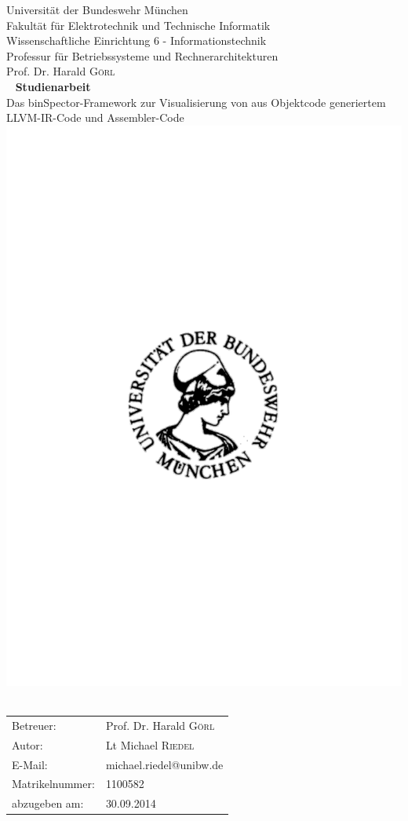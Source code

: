\begin{titlepage}
    \thispagestyle{empty}
    \begin{center}
        \singlespacing
        {Universität der Bundeswehr München\\
        Fakultät für Elektrotechnik und Technische Informatik\\
        Wissenschaftliche Einrichtung 6 - Informationstechnik\\
        Professur für Betriebssysteme und Rechnerarchitekturen}\\
        Prof. Dr. Harald \textsc{Görl}\\
        
        ~\vfill
        \onehalfspacing 
        \Huge{\bfseries{Studienarbeit}}\\[0.5cm]
        
        \large{
        Das binSpector-Framework zur Visualisierung von aus Objektcode generiertem LLVM-IR-Code und Assembler-Code}
        \\[3cm]
        \includegraphics[width=.25\textwidth,natwidth=228,natheight=224]{../Resources/Bilder/athene.pdf}~
        \\[3cm]
    \end{center}
    
    \begin{center}
        \singlespacing
        \small{
        \begin{tabular}{l l}
            Betreuer: & Prof. Dr. Harald \textsc{Görl}\\
            Autor: & Lt Michael \textsc{Riedel}\\
            E-Mail: & michael.riedel@unibw.de\\
            Matrikelnummer: & 1100582\\
            abzugeben am: & 30.09.2014\\
        \end{tabular}}
    \end{center}
\end{titlepage}